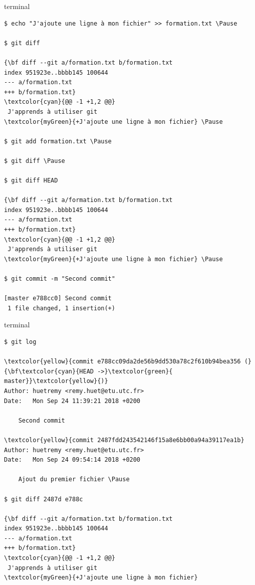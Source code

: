 \documentclass[usepdftitle=false]{beamer}
\def\seplength{.3\topsep}
\newcommand{\Pause}{%
\ifdef{\Release}
  {\pause}
  {}
}
\begin{document}
\begin{frame}[fragile]
	\begin{beamercolorbox}[rounded=true,shadow=true]{terminal}
\vspace{-\seplength}
		\begin{Verbatim}
$ echo "J'ajoute une ligne à mon fichier" >> formation.txt \Pause

$ git diff

{\bf diff --git a/formation.txt b/formation.txt
index 951923e..bbbb145 100644
--- a/formation.txt
+++ b/formation.txt}
\textcolor{cyan}{@@ -1 +1,2 @@}
 J'apprends à utiliser git
\textcolor{myGreen}{+J'ajoute une ligne à mon fichier} \Pause

$ git add formation.txt \Pause

$ git diff \Pause

$ git diff HEAD

{\bf diff --git a/formation.txt b/formation.txt
index 951923e..bbbb145 100644
--- a/formation.txt
+++ b/formation.txt}
\textcolor{cyan}{@@ -1 +1,2 @@}
 J'apprends à utiliser git
\textcolor{myGreen}{+J'ajoute une ligne à mon fichier} \Pause

$ git commit -m "Second commit"

[master e788cc0] Second commit
 1 file changed, 1 insertion(+)

\end{Verbatim}
	\end{beamercolorbox}
\end{frame}

\begin{frame}[fragile]
	\begin{beamercolorbox}[rounded=true,shadow=true]{terminal}
\vspace{-\seplength}
		\begin{Verbatim}
$ git log

\textcolor{yellow}{commit e788cc09da2de56b9dd530a78c2f610b94bea356 (}{\bf\textcolor{cyan}{HEAD ->}\textcolor{green}{ master}}\textcolor{yellow}{)}
Author: huetremy <remy.huet@etu.utc.fr>
Date:   Mon Sep 24 11:39:21 2018 +0200

    Second commit

\textcolor{yellow}{commit 2487fdd243542146f15a8e6bb00a94a39117ea1b}
Author: huetremy <remy.huet@etu.utc.fr>
Date:   Mon Sep 24 09:54:14 2018 +0200

    Ajout du premier fichier \Pause

$ git diff 2487d e788c

{\bf diff --git a/formation.txt b/formation.txt
index 951923e..bbbb145 100644
--- a/formation.txt
+++ b/formation.txt}
\textcolor{cyan}{@@ -1 +1,2 @@}
 J'apprends à utiliser git
\textcolor{myGreen}{+J'ajoute une ligne à mon fichier}
    		
		\end{Verbatim}
	\end{beamercolorbox}
\end{frame}
\end{document}
